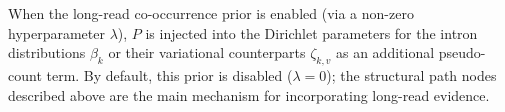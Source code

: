 \documentclass[11pt]{article}
\begin{document}
When the long-read co-occurrence prior is enabled (via a non-zero
hyperparameter \(\lambda\)), \(P\) is injected into the Dirichlet parameters
for the intron distributions \(\beta_k\) or their variational counterparts
\(\zeta_{k,v}\) as an additional pseudo-count term. By default, this prior
is disabled (\(\lambda = 0\)); the structural path nodes described above
are the main mechanism for incorporating long-read evidence.
\end{document}
